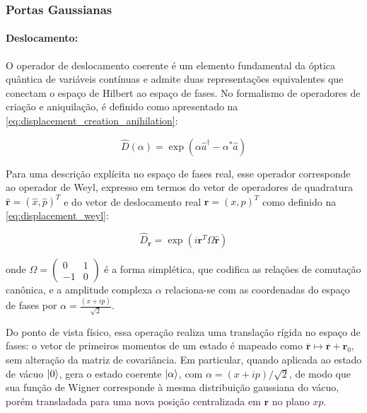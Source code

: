 \subsubsection{Portas Gaussianas}

\paragraph*{\textbf{Deslocamento}:}

O operador de deslocamento coerente é um elemento fundamental da óptica quântica de variáveis contínuas e admite duas representações equivalentes que conectam o espaço de Hilbert ao espaço de fases. No formalismo de operadores de criação e aniquilação, é definido como apresentado na \autoref{eq:displacement_creation_anihilation}:

\begin{equation}
\label{eq:displacement_creation_anihilation}
\hat{D}(\alpha) = \exp(\alpha\hat{a}^\dagger - \alpha^*\hat{a})
\end{equation}

Para uma descrição explícita no espaço de fases real, esse operador corresponde ao operador de Weyl, expresso em termos do vetor de operadores de quadratura $\hat{\mathbf{r}}=(\hat{x},\hat{p})^T$ e do vetor de deslocamento real $\mathbf{r}=(x,p)^T$ como definido na \autoref{eq:displacement_weyl}:

\begin{equation}
\label{eq:displacement_weyl}
\hat{D}_{\mathbf{r}} = \exp(i\mathbf{r}^T \Omega \hat{\mathbf{r}})
\end{equation}

\noindent onde $\Omega = \displaystyle\left(\begin{array}{cc} 0 & 1 \\ -1 & 0 \end{array}\right)$ é a forma simplética, que codifica as relações de comutação canônica, e a amplitude complexa $\alpha$ relaciona-se com as coordenadas do espaço de fases por $\alpha =\displaystyle\frac{(x+ip)}{\sqrt{2}}$.

Do ponto de vista físico, essa operação realiza uma translação rígida no espaço de fases: o vetor de primeiros momentos de um estado é mapeado como $\overline{\mathbf{r}} \mapsto \overline{\mathbf{r}} + \mathbf{r}_0$, sem alteração da matriz de covariância. Em particular, quando aplicada ao estado de vácuo $\ket{0}$, gera o estado coerente $\ket{\alpha}$, com $\alpha=(x+ip)/\sqrt{2}$, de modo que sua função de Wigner corresponde à mesma distribuição gaussiana do vácuo, porém transladada para uma nova posição centralizada em $\mathbf{r}$ no plano $xp$.

